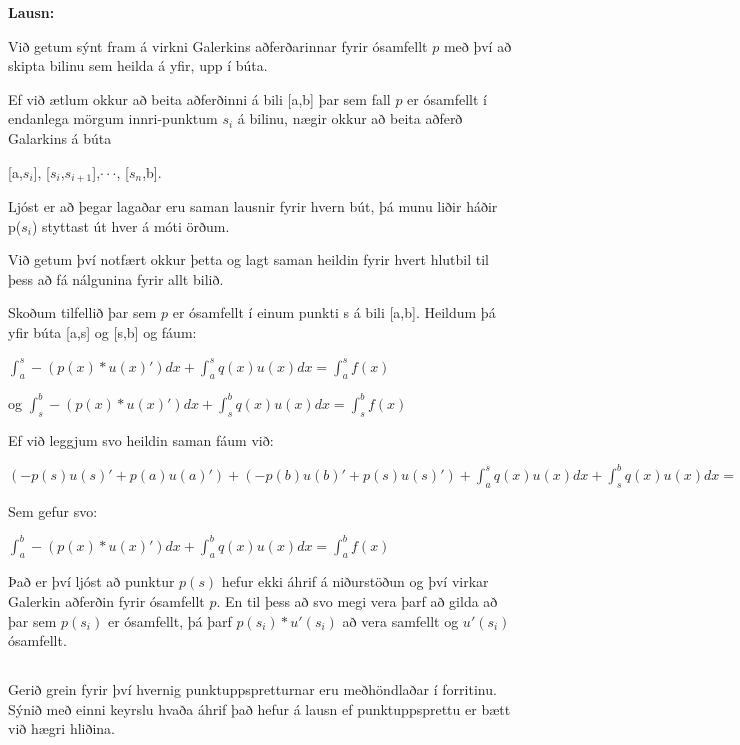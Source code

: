 \documentclass[11pt,a4paper,titlepage]{article}
\begin{document}
\textbf{Lausn:} \par

Við getum sýnt fram á virkni Galerkins aðferðarinnar fyrir ósamfellt $p$ með því að skipta bilinu sem heilda á yfir, upp í búta.\par
Ef við ætlum okkur að beita aðferðinni á bili [a,b] þar sem fall $p$ er ósamfellt í endanlega mörgum innri-punktum $s_{i}$ á bilinu, nægir okkur að beita aðferð Galarkins á búta\par \begin{center}[a,$s_{i}$], [$s_{i}$,$s_{i+1}$],$\cdot \cdot \cdot$, [$s_{n}$,b].\end{center}
Ljóst er að þegar lagaðar eru saman lausnir fyrir hvern bút, þá munu liðir háðir p($s_{i}$) styttast út hver á móti örðum.\par
Við getum því notfært okkur þetta og lagt saman heildin fyrir hvert hlutbil til þess að fá nálgunina fyrir allt bilið.

Skoðum tilfellið þar sem $p$ er ósamfellt í einum punkti s á bili [a,b].
Heildum þá yfir búta [a,s] og [s,b] og fáum:\par
\begin{center}
	$\int_{a}^{s}-(p(x)*u{(x)}')dx + \int_{a}^{s}q(x)u(x)dx= \int_{a}^{s}f(x)$ \par
	og $\int_{s}^{b}-(p(x)*u{(x)}')dx + \int_{s}^{b}q(x)u(x)dx= \int_{s}^{b}f(x)$
\end{center}
Ef við leggjum svo heildin saman fáum við:\par
\begin{center}
	$(-p(s)u{(s)}'+p(a)u{(a)}')+(-p(b)u{(b)}'+p(s)u{(s)}')+ \int_{a}^{s}q(x)u(x)dx+ \int_{s}^{b}q(x)u(x)dx =\int_{a}^{s}f(x)+\int_{s}^{b}f(x)$
\end{center}
Sem gefur svo: 
\begin{center}
	$\int_{a}^{b}-(p(x)*u{(x)}')dx + \int_{a}^{b}q(x)u(x)dx= \int_{a}^{b}f(x)$
\end{center} \par
Það er því ljóst að punktur $p(s)$ hefur ekki áhrif á niðurstöðun og því virkar Galerkin aðferðin fyrir ósamfellt $p$. 
En til þess að svo megi vera þarf að gilda að þar sem $p(s_{i})$ er ósamfellt, þá þarf $p(s_{i})*u'(s_{i})$ að vera samfellt og $u'(s_{i})$ ósamfellt.


\subsection{}
Gerið grein fyrir því hvernig punktuppspretturnar eru meðhöndlaðar í forritinu. Sýnið með einni keyrslu hvaða áhrif það hefur á lausn ef punktuppsprettu er bætt við hægri hliðina. 
\end{document}
